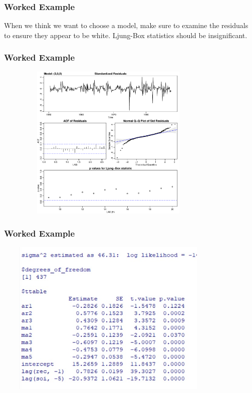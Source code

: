 \documentclass[%
xcolor=pdftex]{beamer}
\begin{document}
\begin{frame}
\frametitle{Worked Example}

When we think we want to choose a model, make sure to examine the residuals to ensure they appear to be white. Ljung-Box statistics should be insignificant.

\end{frame}

\begin{frame}
\frametitle{Worked Example}

\includegraphics[width=110mm, height=75mm]{diag2.pdf}


\end{frame}

\begin{frame}
\frametitle{Worked Example}

\includegraphics[width=110mm, height=75mm]{lagreg.jpg}



\end{frame}
\end{document}
